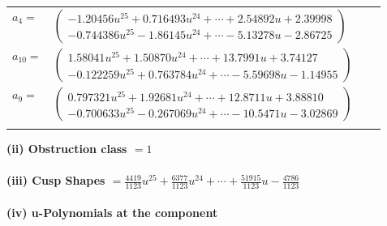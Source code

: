 \documentclass[1p]{elsarticle_modified}
\theoremstyle{definition}
\begin{document}
\begin{tabular}{m{7pt} m{180pt} m{7pt} m{180pt} }
\flushright $a_{4}=$&$\begin{pmatrix}-1.20456 u^{25}+0.716493 u^{24}+\cdots+2.54892 u+2.39998\\-0.744386 u^{25}-1.86145 u^{24}+\cdots-5.13278 u-2.86725\end{pmatrix}$ \\
\flushright $a_{10}=$&$\begin{pmatrix}1.58041 u^{25}+1.50870 u^{24}+\cdots+13.7991 u+3.74127\\-0.122259 u^{25}+0.763784 u^{24}+\cdots-5.59698 u-1.14955\end{pmatrix}$ \\
\flushright $a_{9}=$&$\begin{pmatrix}0.797321 u^{25}+1.92681 u^{24}+\cdots+12.8711 u+3.88810\\-0.700633 u^{25}-0.267069 u^{24}+\cdots-10.5471 u-3.02869\end{pmatrix}$\\&\end{tabular}
\flushleft \textbf{(ii) Obstruction class $= 1$}\\~\\
\flushleft \textbf{(iii) Cusp Shapes $= \frac{4419}{1123} u^{25}+\frac{6377}{1123} u^{24}+\cdots+\frac{51915}{1123} u-\frac{4786}{1123}$}\\~\\
\newpage\renewcommand{\arraystretch}{1}
\flushleft \textbf{(iv) u-Polynomials at the component}\newline \\
\end{document}
